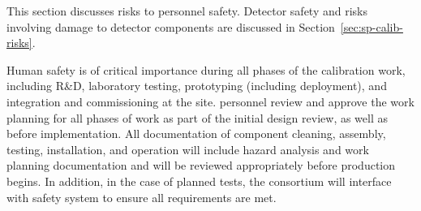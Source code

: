 

This section discusses risks to personnel safety. Detector safety and risks involving damage to detector components are discussed in Section~\ref{sec:sp-calib-risks}.

Human safety is of critical importance during all phases of the calibration work, including R\&D, laboratory testing, prototyping (including  deployment), and integration and commissioning at the   site.   personnel review and approve the work planning for all phases of work as part of the initial design review, as well as before implementation. All documentation of component cleaning, assembly, testing, installation, and operation will include hazard analysis and work planning documentation and will be reviewed appropriately before production begins. In addition, in the case of planned  tests, the consortium will interface with  safety system to ensure all requirements are met.


